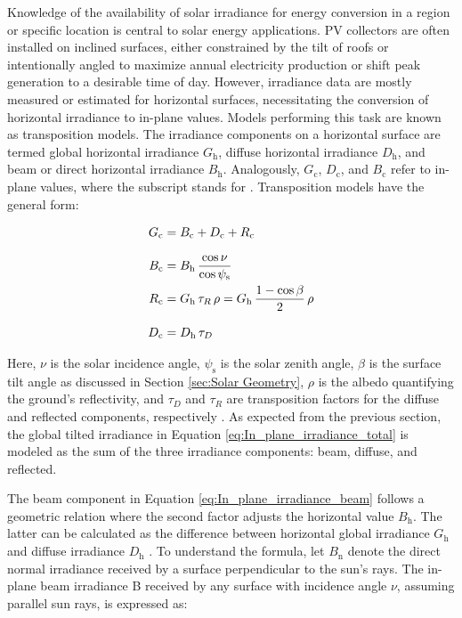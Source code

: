 
Knowledge of the availability of solar irradiance for energy conversion in a region
or specific location is central to solar energy applications. PV collectors are often
installed on inclined surfaces, either constrained by the tilt of roofs or intentionally
angled to maximize annual electricity production or shift peak generation to a desirable
time of day. However, irradiance data are mostly measured or estimated for horizontal
surfaces, necessitating the conversion of horizontal irradiance to in-plane values.
Models performing this task are known as transposition models.
The irradiance components on a horizontal surface are termed global horizontal
irradiance \(G_{\text{h}}\), diffuse horizontal irradiance \(D_{\text{h}}\), and beam or direct
horizontal irradiance \(B_{\text{h}}\). Analogously, \(G_{\text{c}}\), \(D_{\text{c}}\),
and \(B_{\text{c}}\) refer to in-plane values, where the subscript  stands
for . Transposition models have the general form:

\begin{align}
    G_{\text{c}} &= B_{\text{c}} + D_{\text{c}} + R_{\text{c}}
    \label{eq:In_plane_irradiance_total} \\[8pt]
    B_{\text{c}} &= B_{\text{h}} \, \frac{\cos \nu}{\cos \psi_{\text{s}}}
    \label{eq:In_plane_irradiance_beam} \\[0pt]
    R_{\text{c}} &= G_{\text{h}} \, \tau_{R} \, \rho = G_{\text{h}} \, \frac{1 - \cos \beta}{2} \, \rho
    \label{eq:In_plane_irradiance_reflected} \\[8pt]
    D_{\text{\text{c}}} &= D_{\text{h}} \, \tau_{D}
    \label{eq:In_plane_irradiance_diffuse}
\end{align}

\noindent
Here, \(\nu\) is the solar incidence angle, \(\psi_{\text{s}}\) is the solar zenith angle,
\(\beta\) is the surface tilt angle as discussed in Section \ref{sec:Solar Geometry},
\(\rho\) is the albedo quantifying the ground's reflectivity, and \(\tau_{D}\) and \(\tau_{R}\)
are transposition factors for the diffuse and reflected components, respectively
\cite[p. 1f]{Quan2020}. As expected from the previous section, the global tilted
irradiance in Equation \ref{eq:In_plane_irradiance_total} is modeled as the sum
of the three irradiance components: beam, diffuse, and reflected.

The beam component in Equation \ref{eq:In_plane_irradiance_beam} follows a geometric
relation where the second factor adjusts the horizontal value \(B_{\text{h}}\). The latter can be
calculated as the difference between horizontal global irradiance \(G_{\text{h}}\) and diffuse
irradiance \(D_{\text{h}}\) \cite[p. 144]{Muneer}. To understand the formula, let \(B_{\text{n}}\) denote
the direct normal irradiance received by a surface perpendicular to the sun's rays.
The in-plane beam irradiance B received by any surface with incidence angle \(\nu\), 
assuming parallel sun rays, is expressed as:

